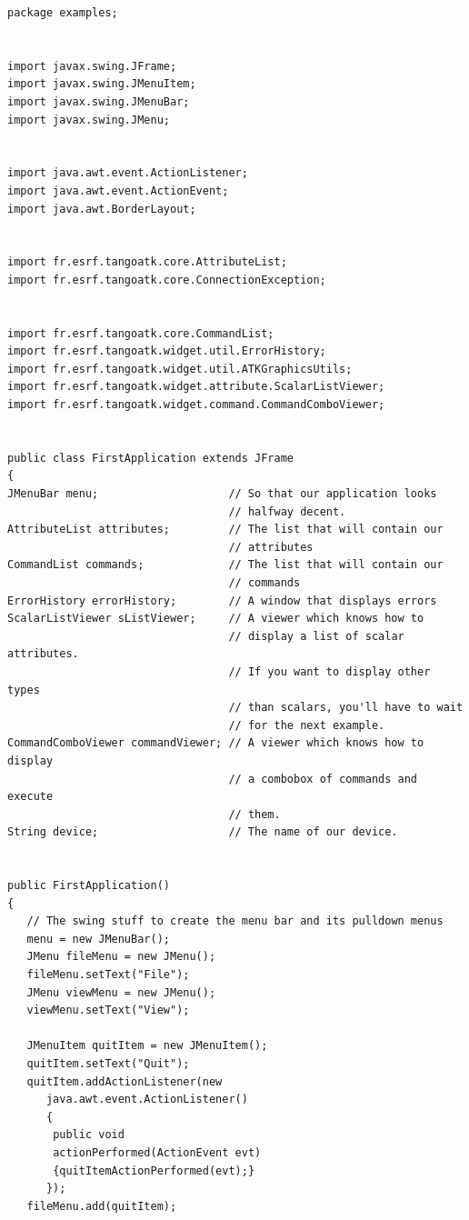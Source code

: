 \begin{verbatim}
package examples;
 

import javax.swing.JFrame;
import javax.swing.JMenuItem;
import javax.swing.JMenuBar;
import javax.swing.JMenu;
 

import java.awt.event.ActionListener;
import java.awt.event.ActionEvent;
import java.awt.BorderLayout;
 

import fr.esrf.tangoatk.core.AttributeList;
import fr.esrf.tangoatk.core.ConnectionException;
 

import fr.esrf.tangoatk.core.CommandList;
import fr.esrf.tangoatk.widget.util.ErrorHistory;
import fr.esrf.tangoatk.widget.util.ATKGraphicsUtils;
import fr.esrf.tangoatk.widget.attribute.ScalarListViewer;
import fr.esrf.tangoatk.widget.command.CommandComboViewer;
 

public class FirstApplication extends JFrame
{
JMenuBar menu;                    // So that our application looks
                                  // halfway decent.
AttributeList attributes;         // The list that will contain our
                                  // attributes
CommandList commands;             // The list that will contain our
                                  // commands
ErrorHistory errorHistory;        // A window that displays errors
ScalarListViewer sListViewer;     // A viewer which knows how to
                                  // display a list of scalar attributes.
                                  // If you want to display other types
                                  // than scalars, you'll have to wait
                                  // for the next example.
CommandComboViewer commandViewer; // A viewer which knows how to display
                                  // a combobox of commands and execute
                                  // them.
String device;                    // The name of our device.
 

public FirstApplication()
{
   // The swing stuff to create the menu bar and its pulldown menus
   menu = new JMenuBar();
   JMenu fileMenu = new JMenu();
   fileMenu.setText("File");   
   JMenu viewMenu = new JMenu();
   viewMenu.setText("View");

   JMenuItem quitItem = new JMenuItem();
   quitItem.setText("Quit");
   quitItem.addActionListener(new 
      java.awt.event.ActionListener()
      {                 
       public void
       actionPerformed(ActionEvent evt)
       {quitItemActionPerformed(evt);}
      });
   fileMenu.add(quitItem);


\end{verbatim}
